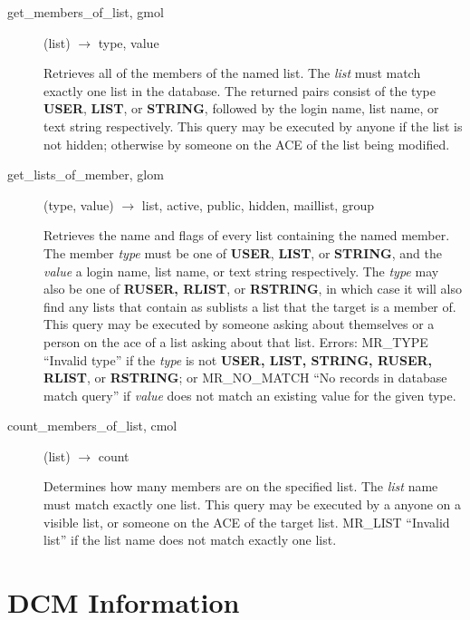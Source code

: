 \documentclass{article}
\begin{document}
\begin{description}
\item[get\_members\_of\_list, gmol](list) $\rightarrow$ type, value

Retrieves all of the members of the named list.  The {\em list} must
match exactly one list in the database.  The returned pairs consist of
the type {\bf USER}, {\bf LIST}, or {\bf STRING}, followed by the login
name, list name, or text string respectively.  This query may be
executed by anyone if the list is not hidden; otherwise by someone on
the ACE of the list being modified.

\item[get\_lists\_of\_member, glom](type, value) $\rightarrow$ list, active,
public, hidden, maillist, group

Retrieves the name and flags of every list containing the named
member.  The member {\em type} must be one of {\bf USER}, {\bf LIST}, or
{\bf STRING}, and the {\em value} a login name, list name, or text string
respectively.  The {\em type} may also be one of {\bf RUSER, RLIST}, or
{\bf RSTRING}, in which case it will also find any lists that contain as
sublists a list that the target is a member of.  This query may be
executed by someone asking about themselves or a person on the ace of
a list asking about that list.  Errors: MR\_TYPE ``Invalid type'' if the
{\em type} is not {\bf USER, LIST, STRING, RUSER, RLIST}, or {\bf RSTRING};
or MR\_NO\_MATCH ``No records in database match query'' if {\em value} does
not match an existing value for the given type.

\item[count\_members\_of\_list, cmol](list) $\rightarrow$ count

Determines how many members are on the specified list.  The {\em list}
name must match exactly one list.  This query may be executed by a
anyone on a visible list, or someone on the ACE of the target list.
MR\_LIST ``Invalid list'' if the list name does not match exactly one
list.

\end{description}

\section{DCM Information}
\end{document}
